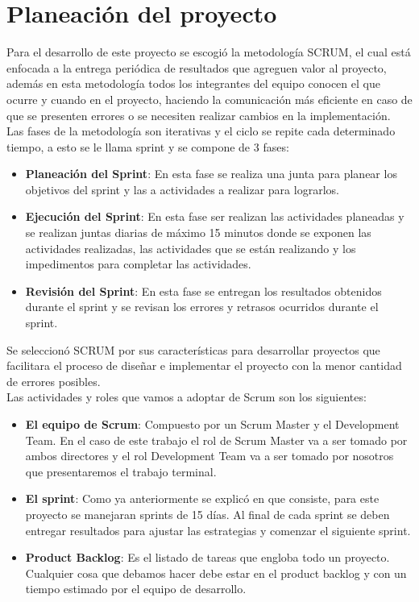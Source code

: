 
\clearpage
\section{Planeación del proyecto}
Para el desarrollo de este proyecto se escogió la metodología SCRUM, el cual está enfocada a la
entrega periódica de resultados que agreguen valor al proyecto, además en esta metodología todos los integrantes del
equipo conocen el que ocurre y cuando en el proyecto, haciendo la comunicación más eficiente en caso de que se presenten errores
o se necesiten realizar cambios en la implementación.\\
Las fases de la metodología son iterativas y el ciclo se repite cada determinado tiempo, a esto se le llama
sprint y se compone de 3 fases:

 \begin{itemize}
    \item \textbf{Planeación del Sprint}: En esta fase se realiza una junta para planear los objetivos del sprint y las a actividades
    a realizar para lograrlos.
    \item \textbf{Ejecución del Sprint}: En esta fase ser realizan las actividades planeadas y se realizan juntas diarias de máximo
    15 minutos donde se exponen las actividades realizadas, las actividades que se están realizando y los
    impedimentos para completar las actividades.
    \item \textbf{Revisión del Sprint}: En esta fase se entregan los resultados obtenidos durante el sprint y se revisan los errores
    y retrasos ocurridos durante el sprint.
 \end{itemize}



Se seleccionó SCRUM por sus características para desarrollar proyectos que facilitara el proceso de diseñar e
implementar el proyecto con la menor cantidad de errores posibles.\\

Las actividades y roles que vamos a adoptar de Scrum son los siguientes:
\begin{itemize}
    \item \textbf{El equipo de Scrum}: Compuesto por un Scrum Master y el Development Team. En el caso de este trabajo el
rol de Scrum Master va a ser tomado por ambos directores y el rol Development Team va a ser tomado por
nosotros que presentaremos el trabajo terminal.
    \item \textbf{El sprint}: Como ya anteriormente se explicó en que consiste, para este proyecto se manejaran sprints de 15
días. Al final de cada sprint se deben entregar resultados para ajustar las estrategias y comenzar el siguiente
sprint.
    \item \textbf{Product Backlog}: Es el listado de tareas que engloba todo un proyecto. Cualquier cosa que debamos hacer
debe estar en el product backlog y con un tiempo estimado por el equipo de desarrollo.
\end{itemize}


